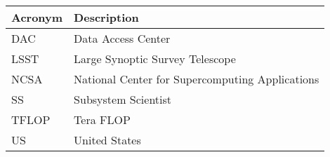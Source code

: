 \addtocounter{table}{-1}
\begin{longtable}{|l|p{}|}\hline 
\textbf{Acronym} & \textbf{Description}  \\\hline
DAC&Data Access Center \\\hline
LSST&Large Synoptic Survey Telescope \\\hline
NCSA&National Center for Supercomputing Applications \\\hline
SS&Subsystem Scientist \\\hline
TFLOP&Tera FLOP \\\hline
US&United States \\\hline
\end{longtable} 
